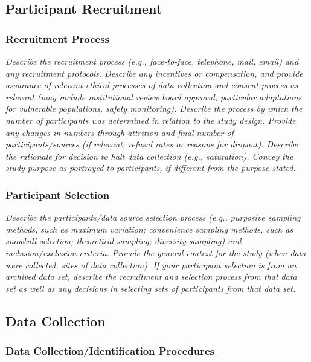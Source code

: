 \documentclass[acmsmall]{acmart}
\begin{document}
\subsection{Participant Recruitment}
\subsubsection{Recruitment Process}

{\em\small Describe the recruitment process (e.g., face-to-face, telephone, mail, email) and any recruitment protocols. Describe any incentives or compensation, and provide assurance of relevant ethical processes of data collection and consent process as relevant (may include institutional review board approval, particular adaptations for vulnerable populations, safety monitoring). Describe the process by which the number of participants was determined in relation to the
study design. Provide any changes in numbers through attrition and final number of participants/sources (if relevant, refusal rates or reasons for dropout). Describe the rationale for decision to halt data collection (e.g., saturation). Convey the study purpose as portrayed to participants, if different from the purpose stated. }

\subsubsection{Participant Selection}

{\em\small Describe the participants/data source selection process (e.g., purposive sampling methods, such as maximum variation; convenience sampling methods, such as snowball selection; theoretical sampling; diversity sampling) and inclusion/exclusion criteria. Provide the general context for the study (when data were collected, sites of data collection). If your participant selection is from an archived data set, describe the recruitment and selection process from that data set as well as any decisions in selecting sets of participants from that data set. }

\subsection{Data Collection}

\subsubsection{Data Collection/Identification Procedures}
\end{document}
